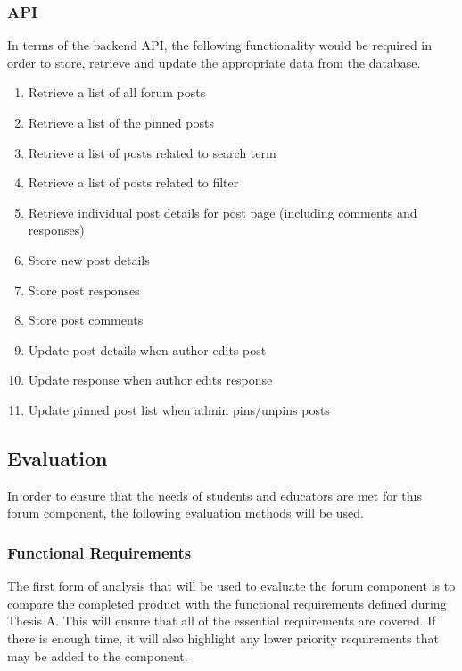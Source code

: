 \subsubsection{API}
In terms of the backend API, the following functionality would be required in order to store, retrieve and update the appropriate data from the database.

\begin{enumerate}
    \item Retrieve a list of all forum posts
    \item Retrieve a list of the pinned posts
    \item Retrieve a list of posts related to search term
    \item Retrieve a list of posts related to filter
    \item Retrieve individual post details for post page (including comments and responses)
    \item Store new post details
    \item Store post responses
    \item Store post comments
    \item Update post details when author edits post
    \item Update response when author edits response
    \item Update pinned post list when admin pins/unpins posts
\end{enumerate}

\subsection{Evaluation}
In order to ensure that the needs of students and educators are met for this forum component, the following evaluation methods will be used.

\subsubsection{Functional Requirements}
The first form of analysis that will be used to evaluate the forum component is to compare the completed product with the functional requirements defined during Thesis A.
This will ensure that all of the essential requirements are covered.
If there is enough time, it will also highlight any lower priority requirements that may be added to the component.

